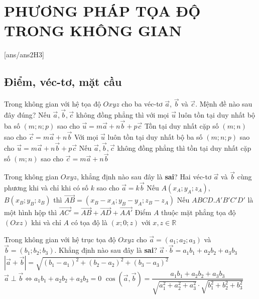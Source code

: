 \section{PHƯƠNG PHÁP TỌA ĐỘ TRONG KHÔNG GIAN}
[ans/ans2H3]
\subsection{Điểm, véc-tơ, mặt cầu}
\begin{ex}%
	Trong không gian với hệ tọa độ $Oxyz$ cho ba véc-tơ $\vec{a}$, $\vec{b}$ và $\vec{c}$. Mệnh đề nào sau đây đúng?
	\choice
	{\True Nếu $\vec{a},\vec{b},\vec{c}$ không đồng phẳng thì với mọi $\vec{u}$ luôn tồn tại duy nhất bộ ba số $(m;n;p)$ sao cho $\vec{u}=m\vec{a}+n\vec{b}+p\vec{c}$}
	{Tồn tại duy nhất cặp số $(m;n)$ sao cho $\vec{c}=m\vec{a}+n\vec{b}$}
	{Với mọi $\vec{u}$ luôn tồn tại duy nhất bộ ba số $(m;n;p)$ sao cho $\vec{u}=m\vec{a}+n\vec{b}+p\vec{c}$}
	{Nếu $\vec{a},\vec{b},\vec{c}$ không đồng phẳng thì tồn tại duy nhất cặp số $(m;n)$ sao cho $\vec{c}=m\vec{a}+n\vec{b}$}
\end{ex}
\begin{ex}%
	Trong không gian $Oxyz$, khẳng định nào sau đây là \textbf{sai}?
	\choice
	{\True Hai véc-tơ $\vec{a}$ và $\vec{b}$ cùng phương khi và chỉ khi có số $k$ sao cho $\vec{a}=k\vec{b}$}
	{Nếu $A(x_A;y_A;z_A)$, $B(x_B;y_B;z_B)$ thì $\vec{AB}=\left(x_B-x_A;y_B-y_A;z_B-z_A\right)$}
	{Nếu $ABCD.A'B'C'D'$ là một hình hộp thì $\vec{AC'}=\vec{AB}+\vec{AD}+\vec{AA'}$}
	{Điểm $A$ thuộc mặt phẳng tọa độ $(Oxz)$ khi và chỉ $A$ có tọa độ là $(x;0;z)$ với $x,z\in\mathbb{R}$}
\end{ex}

\begin{ex}%
	Trong không gian với hệ trục tọa độ $Oxyz$ cho $\vec{a}=(a_1;a_2;a_3)$ và $\vec{b}=(b_1;b_2;b_3)$. Khẳng định nào sau đây là \textbf{sai}?
	\choice
	{$\vec{a}\cdot\vec{b}=a_1b_1+a_2b_2+a_3b_3$}
	{\True $\left|\vec{a}+\vec{b}\right|=\sqrt{(b_1-a_1)^2+(b_2-a_2)^2+(b_3-a_3)^2}$}
	{$\vec{a}\perp\vec{b}\Leftrightarrow a_1b_1+a_2b_2+a_3b_3=0$}
	{$\cos (\vec{a},\vec{b})=\dfrac{a_1b_1+a_2b_2+a_3b_3}{\sqrt{a_1^2+a_2^2+a_3^2}\cdot\sqrt{b_1^2+b_2^2+b_3^2}}$}
\end{ex}

